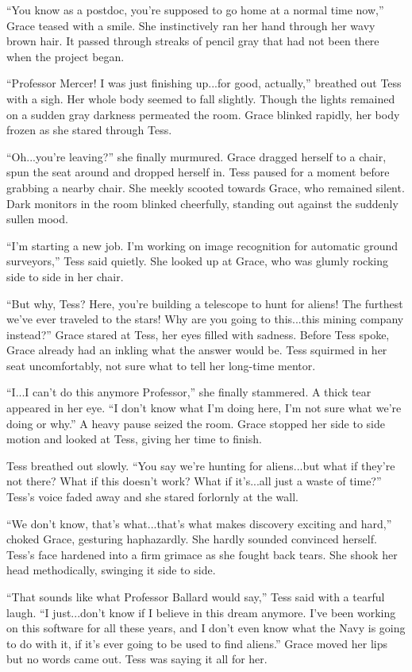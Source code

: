 \documentclass[openany, 12pt]{book} %
\begin{document}
``You know as a postdoc, you're supposed to go home at a normal time now,'' Grace teased with a smile. She instinctively ran her hand through her wavy brown hair. It passed through streaks of pencil gray that had not been there when the project began.

``Professor Mercer! I was just finishing up...for good, actually,'' breathed out Tess with a sigh. Her whole body seemed to fall slightly. Though the lights remained on a sudden gray darkness permeated the room. Grace blinked rapidly, her body frozen as she stared through Tess.

``Oh...you're leaving?'' she finally murmured. Grace dragged herself to a chair, spun the seat around and dropped herself in. Tess paused for a moment before grabbing a nearby chair. She meekly scooted towards Grace, who remained silent. Dark monitors in the room blinked cheerfully, standing out against the suddenly sullen mood.

``I'm starting a new job. I'm working on image recognition for automatic ground surveyors,'' Tess said quietly. She looked up at Grace, who was glumly rocking side to side in her chair.

``But why, Tess? Here, you're building a telescope to hunt for aliens! The furthest we've ever traveled to the stars! Why are you going to this...this mining company instead?'' Grace stared at Tess, her eyes filled with sadness. Before Tess spoke, Grace already had an inkling what the answer would be. Tess squirmed in her seat uncomfortably, not sure what to tell her long-time mentor.

``I...I can't do this anymore Professor,'' she finally stammered. A thick tear appeared in her eye. ``I don't know what I'm doing here, I'm not sure what we're doing or why.'' A heavy pause seized the room. Grace stopped her side to side motion and looked at Tess, giving her time to finish.

Tess breathed out slowly. ``You say we're hunting for aliens...but what if they're not there? What if this doesn't work? What if it's...all just a waste of time?'' Tess's voice faded away and she stared forlornly at the wall.

``We don't know, that's what...that's what makes discovery exciting and hard,'' choked Grace, gesturing haphazardly. She hardly sounded convinced herself. Tess's face hardened into a firm grimace as she fought back tears. She shook her head methodically, swinging it side to side.

``That sounds like what Professor Ballard would say,'' Tess said with a tearful laugh. ``I just...don't know if I believe in this dream anymore. I've been working on this software for all these years, and I don't even know what the Navy is going to do with it, if it's ever going to be used to find aliens.'' Grace moved her lips but no words came out. Tess was saying it all for her.
\end{document}
